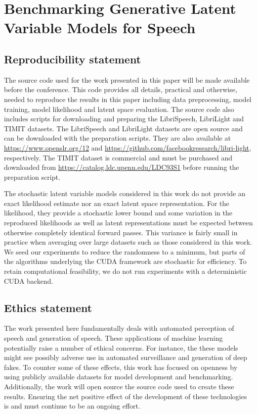 
\chapter[appendix for benchmarking generative latent variable models for speech]{Benchmarking Generative Latent Variable Models for Speech}

\iffalse

\section{Reproducibility statement}\label{app: reproducibility statement}
The source code used for the work presented in this paper will be made available before the conference. 
This code provides all details, practical and otherwise, needed to reproduce the results in this paper including data preprocessing, model training, model likelihood and latent space evaluation.
The source code also includes scripts for downloading and preparing the LibriSpeech, LibriLight and TIMIT datasets. The LibriSpeech and LibriLight datasets are open source and can be downloaded with the preparation scripts. They are also available at \url{https://www.openslr.org/12} and \url{https://github.com/facebookresearch/libri-light}, respectively. The TIMIT dataset is commercial and must be purchased and downloaded from \url{https://catalog.ldc.upenn.edu/LDC93S1} before running the preparation script.

The stochastic latent variable models considered in this work do not provide an exact likelihood estimate nor an exact latent space representation. For the likelihood, they provide a stochastic lower bound and some variation in the reproduced likelihoods as well as latent representations must be expected between otherwise completely identical forward passes. This variance is fairly small in practice when averaging over large datasets such as those considered in this work. We seed our experiments to reduce the randomness to a minimum, but parts of the algorithms underlying the CUDA framework are stochastic for efficiency. To retain computational feasibility, we  do not run experiments with a deterministic CUDA backend.


\section{Ethics statement}\label{app: ethics statement}
The work presented here fundamentally deals with automated perception of speech and generation of speech. These applications of machine learning potentially raise a number of ethical concerns. For instance, the these models might see possibly adverse use in automated surveillance and generation of deep fakes. To counter some of these effects, this work has focused on openness by using publicly available datasets for model development and benchmarking. Additionally, the work will open source the source code used to create these results. 
Ensuring the net positive effect of the development of these technologies is and must continue to be an ongoing effort.


